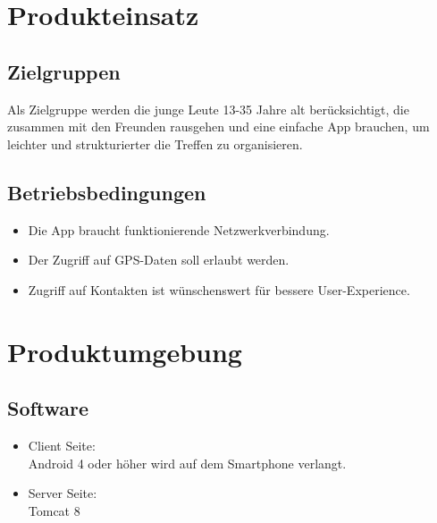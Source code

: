 \documentclass[parskip=full]{scrartcl}
\begin{document}
\newpage
\section{Produkteinsatz}
\subsection{Zielgruppen}
Als Zielgruppe werden die junge Leute 13-35 Jahre alt berücksichtigt, die zusammen mit den Freunden rausgehen und eine einfache App brauchen, um leichter und strukturierter die Treffen zu organisieren.

\subsection{Betriebsbedingungen}
\begin{itemize}
\item Die App braucht funktionierende Netzwerkverbindung.\\
\item Der Zugriff auf GPS-Daten soll erlaubt werden.\\
\item Zugriff auf Kontakten ist wünschenswert für bessere User-Experience.
\end{itemize}

\newpage
\section{Produktumgebung}

\subsection{Software}
\begin{itemize}
	\item Client Seite:\\
	Android 4 oder höher wird auf dem Smartphone verlangt.
	\item Server Seite:\\
	Tomcat 8 
\end{itemize}
\end{document}
